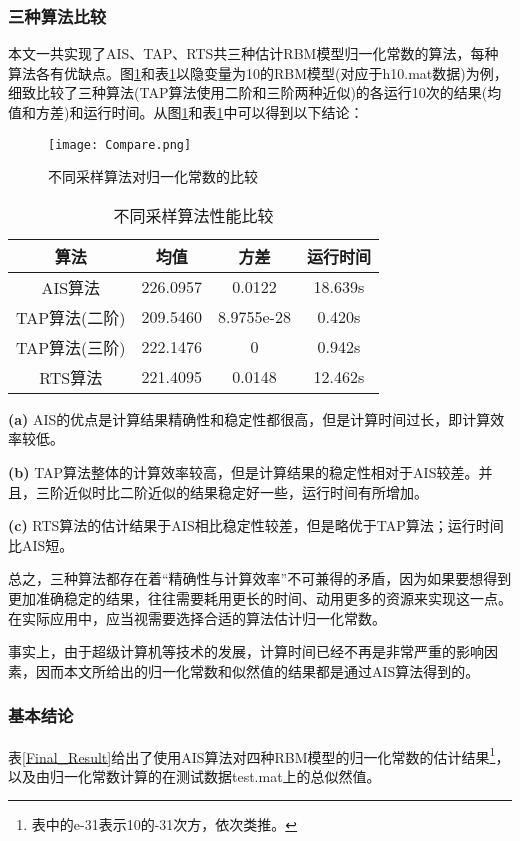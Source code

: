\documentclass[11pt]{article}
\begin{document}
\subsubsection{三种算法比较}
本文一共实现了AIS、TAP、RTS共三种估计RBM模型归一化常数的算法，每种算法各有优缺点。图\ref{TCompare}和表\ref{Compare}以隐变量为10的RBM模型(对应于h10.mat数据)为例，细致比较了三种算法(TAP算法使用二阶和三阶两种近似)的各运行10次的结果(均值和方差)和运行时间。从图\ref{TCompare}和表\ref{Compare}中可以得到以下结论：

\begin{figure}
    \centering
    \texttt{[image: Compare.png]}
    \caption{不同采样算法对归一化常数的比较}
    \label{TCompare}
\end{figure}

\begin{table}[!htbp]
  \centering  
  \begin{tabular}{cccc} 
  \hline
  算法 & 均值 & 方差 & 运行时间\\ \hline
  AIS算法 & 226.0957 & 0.0122 & 18.639s \\
  TAP算法(二阶) & 209.5460 & 8.9755e-28 & 0.420s\\
  TAP算法(三阶) & 222.1476 & 0  & 0.942s\\
  RTS算法 & 221.4095 & 0.0148 & 12.462s\\ 
  \hline
\end{tabular}
\caption{不同采样算法性能比较}
\label{Compare}
\end{table}

\noindent\textbf{(a)}
AIS的优点是计算结果精确性和稳定性都很高，但是计算时间过长，即计算效率较低。

\noindent\textbf{(b)}
TAP算法整体的计算效率较高，但是计算结果的稳定性相对于AIS较差。并且，三阶近似时比二阶近似的结果稳定好一些，运行时间有所增加。

\noindent\textbf{(c)}
RTS算法的估计结果于AIS相比稳定性较差，但是略优于TAP算法；运行时间比AIS短。

总之，三种算法都存在着“精确性与计算效率”不可兼得的矛盾，因为如果要想得到更加准确稳定的结果，往往需要耗用更长的时间、动用更多的资源来实现这一点。在实际应用中，应当视需要选择合适的算法估计归一化常数。

事实上，由于超级计算机等技术的发展，计算时间已经不再是非常严重的影响因素，因而本文所给出的归一化常数和似然值的结果都是通过AIS算法得到的。

\subsubsection{基本结论}
表\ref{Final_Result}给出了使用AIS算法对四种RBM模型的归一化常数的估计结果\footnote{表中的e-31表示10的-31次方，依次类推。}，以及由归一化常数计算的在测试数据test.mat上的总似然值。
\end{document}
